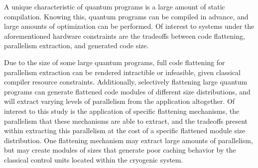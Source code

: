 A unique characteristic of quantum programs is a large amount of static compilation. Knowing this, quantum programs can be compiled in advance, and large amounts of optimization can be performed. Of interest to systems under the aforementioned hardware constraints are the tradeoffs between code flattening, parallelism extraction, and generated code size. 

Due to the size of some large quantum programs, full code flattening for parallelism extraction can be rendered intractible or infeasible, given classical compiler resource constraints. Additionally, selectively flattening large quantum programs can generate flattened code modules of different size distributions, and will extract varying levels of parallelism from the application altogether. Of interest to this study is the application of specific flattening mechanisms, the parallelism that these mechanisms are able to extract, and the tradeoffs present within extracting this parallelism at the cost of a specific flattened module size distribution. One flattening mechanism may extract large amounts of parallelism, but may create modules of sizes that generate poor caching behavior by the classical control units located within the cryogenic system.


